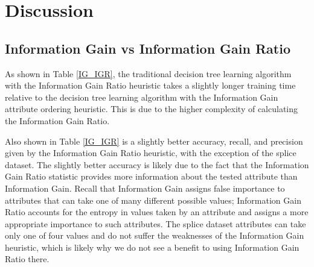 \documentclass[12pt, letterpaper]{article}
\begin{document}
\section{Discussion}
\subsection*{Information Gain vs Information Gain Ratio}
As shown in Table \ref{IG_IGR}, the traditional decision tree learning algorithm 
with the Information Gain Ratio heuristic takes a slightly longer training time relative to
the decision tree learning algorithm with the Information Gain attribute ordering heuristic.
This is due to the higher complexity of calculating the Information Gain Ratio.

Also shown in Table \ref{IG_IGR} is a slightly better accuracy, recall, and precision 
given by the Information Gain Ratio heuristic, with the exception of the splice dataset.
The slightly better accuracy is likely due to the fact that the Information Gain Ratio statistic provides
more information about the tested attribute than Information Gain.  Recall that Information Gain assigns false
importance to attributes that can take one of many different possible values; Information Gain Ratio 
accounts for the entropy in values taken by an attribute and assigns a more
appropriate importance to such attributes.  The splice dataset attributes can take only one of four values\cite{datasets} and
do not suffer the weaknesses of the Information Gain heuristic, which is likely why 
we do not see a benefit to using Information Gain Ratio there.




\end{document}
